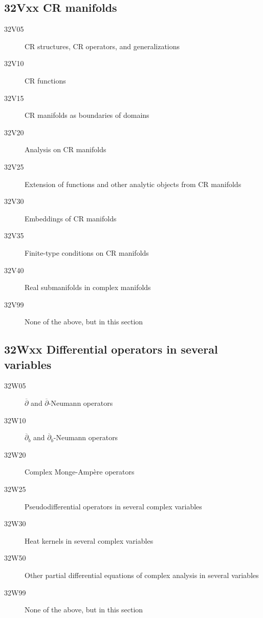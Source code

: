 \subsection*{32Vxx  CR manifolds }\label{32Vxx}
\begin{description}  
\item [32V05]\label{32V05} CR structures, CR operators, and generalizations
\item [32V10]\label{32V10} CR functions
\item [32V15]\label{32V15} CR manifolds as boundaries of domains
\item [32V20]\label{32V20} Analysis on CR manifolds
\item [32V25]\label{32V25} Extension of functions and other analytic objects from CR manifolds
\item [32V30]\label{32V30} Embeddings of CR manifolds
\item [32V35]\label{32V35} Finite-type conditions on CR manifolds
\item [32V40]\label{32V40} Real submanifolds in complex manifolds
\item [32V99]\label{32V99} None of the above, but in this section
\end{description}
\subsection*{32Wxx  Differential operators in several variables }\label{32Wxx}
\begin{description}  
\item [32W05]\label{32W05} $\overline\partial$ and $\overline\partial$-Neumann operators 
\item [32W10]\label{32W10} $\overline\partial_b$ and $\overline\partial_b$-Neumann operators 
\item [32W20]\label{32W20} Complex Monge-Amp\`{e}re operators 
\item [32W25]\label{32W25} Pseudodifferential operators in several complex variables
\item [32W30]\label{32W30} Heat kernels in several complex variables
\item [32W50]\label{32W50} Other partial differential equations of complex analysis in several variables
\item [32W99]\label{32W99} None of the above, but in this section
\end{description}
